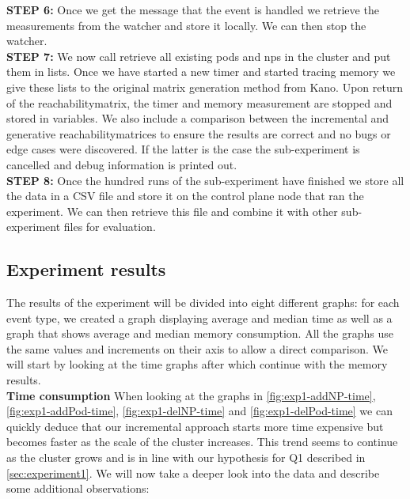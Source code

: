 \textbf{STEP 6:} Once we get the message that the event is handled we retrieve the measurements from the watcher and store it locally. We can then stop the watcher.
\\[10pt]

\textbf{STEP 7:} We now call retrieve all existing pods and \acrshort{np}s in the cluster and put them in lists.  Once we have started a new timer and started tracing memory we give these lists to the original matrix generation method from Kano. Upon return of the reachabilitymatrix, the timer and memory measurement are stopped and stored in variables. We also include a comparison between the incremental and generative reachabilitymatrices to ensure the results are correct and no bugs or edge cases were discovered. If the latter is the case the sub-experiment is cancelled and debug information is printed out.
\\[10pt]

\textbf{STEP 8:} Once the hundred runs of the sub-experiment have finished we store all the data in a CSV file and store it on the control plane node that ran the experiment. We can then retrieve this file and combine it with other sub-experiment files for evaluation. 
\\[10pt]


\subsection{Experiment results} \label{exp1:results}

The results of the experiment will be divided into eight different graphs: for each event type, we created a graph displaying average and median time as well as a graph that shows average and median memory consumption. All the graphs use the same values and increments on their axis to allow a direct comparison. We will start by looking at the time graphs after which continue with the memory results.
\\[10pt]

\textbf{Time consumption}
\newline When looking at the graphs in \autoref{fig:exp1-addNP-time}, \autoref{fig:exp1-addPod-time}, \autoref{fig:exp1-delNP-time}  and \autoref{fig:exp1-delPod-time} we can quickly deduce that our incremental approach starts more time expensive but becomes faster as the scale of the cluster increases. This trend seems to continue as the cluster grows and is in line with our hypothesis for Q1 described in \autoref{sec:experiment1}. We will now take a deeper look into the data and describe some additional observations:

